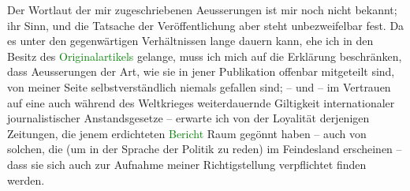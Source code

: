\pstart
           Der Wortlaut der mir zugeschriebenen Aeusserung\introOben{}en\introOben{} ist mir
               noch nicht bekannt; ihr Sinn, und die Tatsache der Veröffentlichung aber steht
               unbezweifelbar fest. Da es unter den gegenwärtigen Verhältnissen lange dauern kann,
               ehe ich in den Besitz des \textcolor{green}{Originalartikels}\ledrightnote{{$\rightarrow$}\emph{\textcolor{green}{?? [Fiktives Interview aus der Kriegszeit]}}} gelange, muss ich mich auf die Erklärung beschränken, dass
               Aeusserungen der Art, wie sie in jener Publikation offenbar mitgeteilt sind, von
               meiner Seite selbstverständlich niemals gefallen sind; – und – im Vertrauen auf eine
               auch während des Weltkrieges weiterdauernde Giltigkeit internationaler
               journalistischer Anstandsgesetze – erwarte ich von {\pb}der
               Loyalität derjenigen Zeitungen, die jenem erdichteten \textcolor{green}{Bericht}\ledrightnote{{$\rightarrow$}\emph{\textcolor{green}{?? [Fiktives Interview aus der Kriegszeit]}}} Raum gegönnt haben – auch von solchen, die (um in
               der Sprache der Politik zu reden) im Feindesland erscheinen – dass sie sich auch zur
               Aufnahme meiner Richtigstellung verpflichtet finden werden.\pend
           {\vspace{1\baselineskip}}
\pstart
